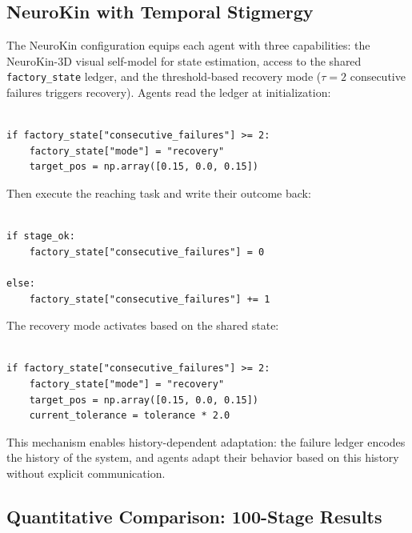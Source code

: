 \documentclass[12pt,a4paper,oneside]{report}
\begin{document}
\subsection{NeuroKin with Temporal Stigmergy}
\label{subsec:neurokin_with_temporal_stigmergy}

The NeuroKin configuration equips each agent with three capabilities: the NeuroKin-3D visual self-model for state estimation, access to the shared \texttt{factory\_state} ledger, and the threshold-based recovery mode ($\tau = 2$ consecutive failures triggers recovery). Agents read the ledger at initialization:
{\small

\begin{verbatim}

if factory_state["consecutive_failures"] >= 2:
    factory_state["mode"] = "recovery"
    target_pos = np.array([0.15, 0.0, 0.15])
\end{verbatim}
}

Then execute the reaching task and write their outcome back:
{\small

\begin{verbatim}

if stage_ok:
    factory_state["consecutive_failures"] = 0

else:
    factory_state["consecutive_failures"] += 1

\end{verbatim}
}

The recovery mode activates based on the shared state:
{\small

\begin{verbatim}

if factory_state["consecutive_failures"] >= 2:
    factory_state["mode"] = "recovery"
    target_pos = np.array([0.15, 0.0, 0.15])
    current_tolerance = tolerance * 2.0

\end{verbatim}
}

This mechanism enables history-dependent adaptation: the failure ledger encodes the history of the system, and agents adapt their behavior based on this history without explicit communication.
\subsection{Quantitative Comparison: 100-Stage Results}
\label{subsec:quantitative_comparison_100_stage_results}
\end{document}

